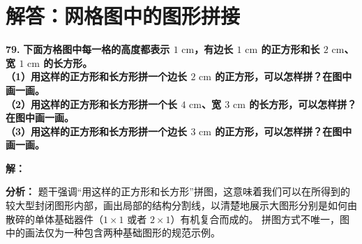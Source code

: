 \documentclass[12pt, a4paper]{ctexrep}
\begin{document}
\newpage

\section{解答：网格图中的图形拼接}

\vspace{0.6cm}

\textbf{\LARGE 79.} \textbf{下⾯方格图中每一格的高度都表示 $1\text{ cm}$，有边长 $1\text{ cm}$ 的正方形和长 $2\text{ cm}$、宽 $1\text{ cm}$ 的长方形。\\[1ex]
（1）用这样的正方形和长方形拼一个边长 $2\text{ cm}$ 的正方形，可以怎样拼？在图中画一画。\\[1ex]
（2）用这样的正方形和长方形拼一个长 $4\text{ cm}$、宽 $3\text{ cm}$ 的长方形，可以怎样拼？在图中画一画。\\[1ex]
（3）用这样的正方形和长方形拼一个边长 $3\text{ cm}$ 的正方形，可以怎样拼？在图中画一画。}

\vspace{0.4cm}
\textbf{解：}

\textbf{分析：}
题干强调“用这样的正方形和长方形”拼图，这意味着我们可以在所得到的较大型封闭图形内部，画出局部的结构分割线，以清楚地展示大图形分别是如何由散碎的单体基础器件（$1\times 1$ 或者 $2\times 1$）有机复合而成的。
拼图方式不唯一，图中的画法仅为一种包含两种基础图形的规范示例。
\end{document}
